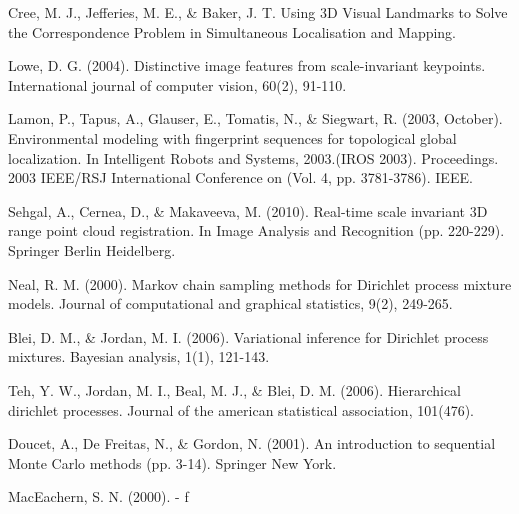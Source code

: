 \documentclass[twoside,hidelinks]{article}
\begin{document}
\begin{thebibliography}{9}
\newblock Cree, M. J., Jefferies, M. E., \& Baker, J. T. Using 3D Visual Landmarks to Solve the Correspondence Problem in Simultaneous Localisation and Mapping.

\newblock Lowe, D. G. (2004). Distinctive image features from scale-invariant keypoints. International journal of computer vision, 60(2), 91-110.

\newblock Lamon, P., Tapus, A., Glauser, E., Tomatis, N., \& Siegwart, R. (2003, October). Environmental modeling with fingerprint sequences for topological global localization. In Intelligent Robots and Systems, 2003.(IROS 2003). Proceedings. 2003 IEEE/RSJ International Conference on (Vol. 4, pp. 3781-3786). IEEE.


\newblock Sehgal, A., Cernea, D., \& Makaveeva, M. (2010). Real-time scale invariant 3D range point cloud registration. In Image Analysis and Recognition (pp. 220-229). Springer Berlin Heidelberg.

\newblock Neal, R. M. (2000). Markov chain sampling methods for Dirichlet process mixture models. Journal of computational and graphical statistics, 9(2), 249-265.

\newblock Blei, D. M., \& Jordan, M. I. (2006). Variational inference for Dirichlet process mixtures. Bayesian analysis, 1(1), 121-143.


\newblock Teh, Y. W., Jordan, M. I., Beal, M. J., \& Blei, D. M. (2006). Hierarchical dirichlet processes. Journal of the american statistical association, 101(476).

\newblock Doucet, A., De Freitas, N., \& Gordon, N. (2001). An introduction to sequential Monte Carlo methods (pp. 3-14). Springer New York.


\newblock MacEachern, S. N. (2000). -
f



\end{thebibliography}
\end{document}
